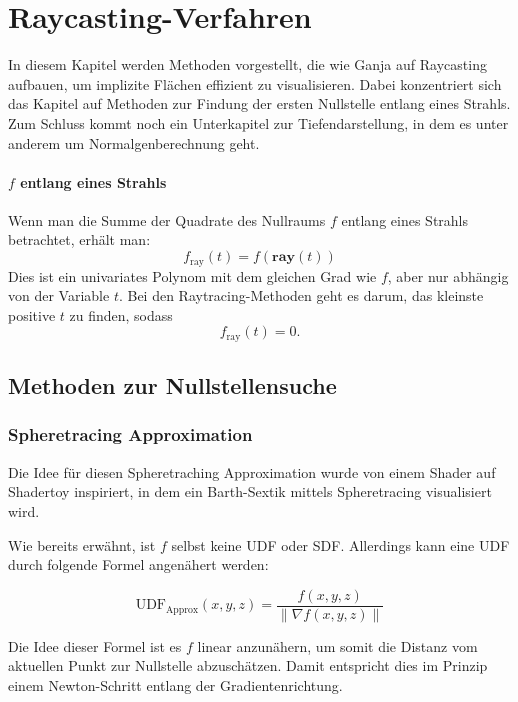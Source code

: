 \documentclass[
	ngerman,%
	accentcolor=9c,%
	ruledheaders=section,%
	class=report,%
	thesis={type=bachelor},%
	fontsize=11pt,%
	parskip=half-,%
	custommargins=true,%
	marginpar=false,%
]{tudapub}
\begin{document}
\chapter{Raycasting-Verfahren}

In diesem Kapitel werden Methoden vorgestellt, die wie Ganja auf Raycasting aufbauen, um implizite Flächen effizient zu visualisieren. Dabei konzentriert sich das Kapitel auf Methoden zur Findung der ersten Nullstelle entlang eines Strahls. 
Zum Schluss kommt noch ein Unterkapitel zur Tiefendarstellung, in dem es unter anderem um Normalgenberechnung geht. 

\subsubsection{\(f\) entlang eines Strahls}

Wenn man die Summe der Quadrate des Nullraums $f$ entlang eines Strahls betrachtet, erhält man:
\[
f_{\text{ray}}(t)=f(\mathbf{ray}(t))
\]
Dies ist ein univariates Polynom mit dem gleichen Grad wie $f$, aber nur abhängig von der Variable $t$.
Bei den Raytracing-Methoden geht es darum, das kleinste positive $t$ zu finden, sodass
\[
f_{\text{ray}}(t) = 0.
\]

\section{Methoden zur Nullstellensuche}
    
\subsection{Spheretracing Approximation}

Die Idee für diesen Spheretraching Approximation wurde von einem Shader auf Shadertoy \cite{shadertoy_barth_sextic_UDF} inspiriert, in dem ein Barth-Sextik mittels Spheretracing visualisiert wird.




Wie bereits erwähnt, ist \( f \) selbst keine UDF oder SDF.  
Allerdings kann eine UDF durch folgende Formel angenähert werden:

\[
\text{UDF}_\text{Approx}(x, y, z) = \frac{f(x, y, z)}{\|\nabla f(x, y, z)\|}
\]

Die Idee dieser Formel ist es \( f \) linear anzunähern, um somit die Distanz vom aktuellen Punkt zur Nullstelle abzuschätzen.
Damit entspricht dies im Prinzip einem Newton-Schritt entlang der Gradientenrichtung.
\end{document}
